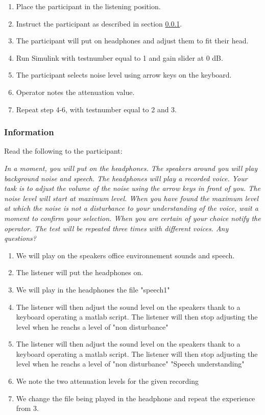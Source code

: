\begin{enumerate}
	\item Place the participant in the listening position.
	\item Instruct the participant as described in section \ref{subsubsec:attenuationInformation}.
	\item The participant will put on headphones and adjust them to fit their head.
	\item Run Simulink  with testnumber equal to 1 and gain slider at 0 dB.
	\item The participant selects noise level using arrow keys on the keyboard.
	\item Operator notes the attenuation value.
	\item Repeat step 4-6, with testnumber equal to 2 and 3.
\end{enumerate}

\subsubsection{Information}\label{subsubsec:attenuationInformation}
Read the following to the participant:

\textit{In a moment, you will put on the headphones. The speakers around you will play background noise and speech. The headphones will play a recorded voice. Your task is to adjust the volume of the noise using the arrow keys in front of you. The noise level will start at maximum level. When you have found the maximum level at which the noise is not a disturbance to your understanding of the voice, wait a moment to confirm your selection. When you are certain of your choice notify the operator. The test will be repeated three times with different voices. Any questions?}

\begin{enumerate}
\item We will play on the speakers office environnement sounds and speech. 
\item The listener will put the headphones on.
\item We will play in the headphones the file "speech1"
\item The listener will then adjust the sound level on the speakers thank to a keyboard operating a matlab script. The listener will then stop adjusting the level when he reachs a level of "non disturbance"
\item The listener will then adjust the sound level on the speakers thank to a keyboard operating a matlab script. The listener will then stop adjusting the level when he reachs a level of "non disturbance" "Speech understanding"
\item We note the two attenuation levels for the given recording
\item We change the file being played in the headphone and repeat the experience from 3.
\end{enumerate}


